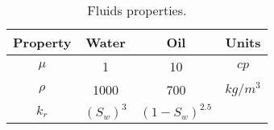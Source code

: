 \documentclass[12pt]{article}
\begin{document}
\begin{table}[!ht]
\hspace{1cm}
\begin{minipage}{.9\textwidth}%
\centering
\begin{tabular}{ |c|c|c|c|} 
\hline
Property&Water&Oil&Units\\
\hline
$\mu$&     1&    10 & $cp$  \\  
$\rho$& 1000& 700& $kg/m^3$\\
$k_r$&$(S_w)^3$&   $(1-S_w)^{2.5}$ &  \\
\hline
\end{tabular}
\caption{Fluids properties.}%
\end{minipage} \hspace{1cm} 
\end{table} 

% 
\end{document}
